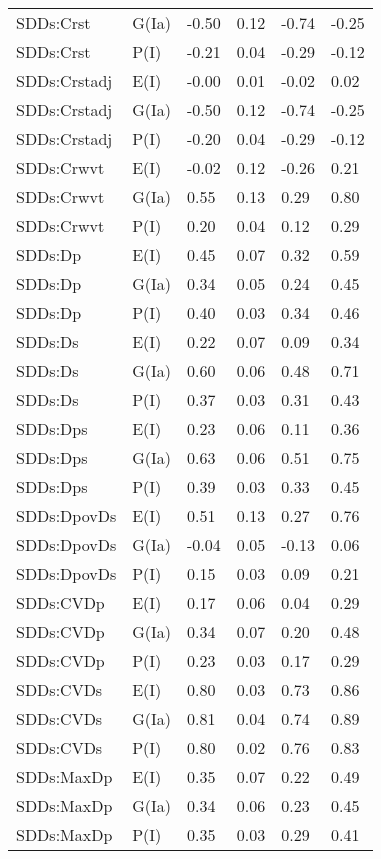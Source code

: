 \begin{center}
\begin{longtable}{|p{1.1in}|p{0.7in}|p{0.7in}|p{0.6in}|p{0.6in}|p{0.6in}|}
  SDDs:Crst & G(Ia) & -0.50 & 0.12 & -0.74 & -0.25 \\ 
  SDDs:Crst & P(I) & -0.21 & 0.04 & -0.29 & -0.12 \\ 
  SDDs:Crstadj & E(I) & -0.00 & 0.01 & -0.02 & 0.02 \\ 
  SDDs:Crstadj & G(Ia) & -0.50 & 0.12 & -0.74 & -0.25 \\ 
  SDDs:Crstadj & P(I) & -0.20 & 0.04 & -0.29 & -0.12 \\ 
  SDDs:Crwvt & E(I) & -0.02 & 0.12 & -0.26 & 0.21 \\ 
  SDDs:Crwvt & G(Ia) & 0.55 & 0.13 & 0.29 & 0.80 \\ 
  SDDs:Crwvt & P(I) & 0.20 & 0.04 & 0.12 & 0.29 \\ 
  SDDs:Dp & E(I) & 0.45 & 0.07 & 0.32 & 0.59 \\ 
  SDDs:Dp & G(Ia) & 0.34 & 0.05 & 0.24 & 0.45 \\ 
  SDDs:Dp & P(I) & 0.40 & 0.03 & 0.34 & 0.46 \\ 
  SDDs:Ds & E(I) & 0.22 & 0.07 & 0.09 & 0.34 \\ 
  SDDs:Ds & G(Ia) & 0.60 & 0.06 & 0.48 & 0.71 \\ 
  SDDs:Ds & P(I) & 0.37 & 0.03 & 0.31 & 0.43 \\ 
  SDDs:Dps & E(I) & 0.23 & 0.06 & 0.11 & 0.36 \\ 
  SDDs:Dps & G(Ia) & 0.63 & 0.06 & 0.51 & 0.75 \\ 
  SDDs:Dps & P(I) & 0.39 & 0.03 & 0.33 & 0.45 \\ 
  SDDs:DpovDs & E(I) & 0.51 & 0.13 & 0.27 & 0.76 \\ 
  SDDs:DpovDs & G(Ia) & -0.04 & 0.05 & -0.13 & 0.06 \\ 
  SDDs:DpovDs & P(I) & 0.15 & 0.03 & 0.09 & 0.21 \\ 
  SDDs:CVDp & E(I) & 0.17 & 0.06 & 0.04 & 0.29 \\ 
  SDDs:CVDp & G(Ia) & 0.34 & 0.07 & 0.20 & 0.48 \\ 
  SDDs:CVDp & P(I) & 0.23 & 0.03 & 0.17 & 0.29 \\ 
  SDDs:CVDs & E(I) & 0.80 & 0.03 & 0.73 & 0.86 \\ 
  SDDs:CVDs & G(Ia) & 0.81 & 0.04 & 0.74 & 0.89 \\ 
  SDDs:CVDs & P(I) & 0.80 & 0.02 & 0.76 & 0.83 \\ 
  SDDs:MaxDp & E(I) & 0.35 & 0.07 & 0.22 & 0.49 \\ 
  SDDs:MaxDp & G(Ia) & 0.34 & 0.06 & 0.23 & 0.45 \\ 
  SDDs:MaxDp & P(I) & 0.35 & 0.03 & 0.29 & 0.41 \\ 

\end{longtable}
\end{center}
